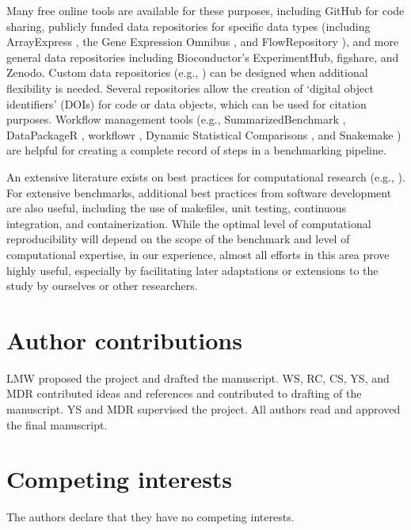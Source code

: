 \documentclass[12pt, a4paper]{article}
\begin{document}
Many free online tools are available for these purposes, including GitHub for code sharing, publicly funded data repositories for specific data types (including ArrayExpress \citep{Kolesnikov2015}, the Gene Expression Omnibus \citep{Barrett2013}, and FlowRepository \citep{Spidlen2012}), and more general data repositories including Bioconductor's ExperimentHub, figshare, and Zenodo. Custom data repositories (e.g., \citep{Soneson2018, Soneson2016}) can be designed when additional flexibility is needed. Several repositories allow the creation of `digital object identifiers' (DOIs) for code or data objects, which can be used for citation purposes. Workflow management tools (e.g., SummarizedBenchmark \citep{Kimes2018}, DataPackageR \citep{Finak2018}, workflowr \citep{Blischak2018}, Dynamic Statistical Comparisons \citep{Wang2018}, and Snakemake \citep{Koster2012}) are helpful for creating a complete record of steps in a benchmarking pipeline.

An extensive literature exists on best practices for computational research (e.g., \citep{Sandve2013}). For extensive benchmarks, additional best practices from software development are also useful, including the use of makefiles, unit testing, continuous integration, and containerization. While the optimal level of computational reproducibility will depend on the scope of the benchmark and level of computational expertise, in our experience, almost all efforts in this area prove highly useful, especially by facilitating later adaptations or extensions to the study by ourselves or other researchers.




\newpage

\section*{Author contributions}

LMW proposed the project and drafted the manuscript. WS, RC, CS, YS, and MDR contributed ideas and references and contributed to drafting of the manuscript. YS and MDR supervised the project. All authors read and approved the final manuscript.




\section*{Competing interests}

The authors declare that they have no competing interests.





\newpage


\singlespacing
\footnotesize




\end{document}
